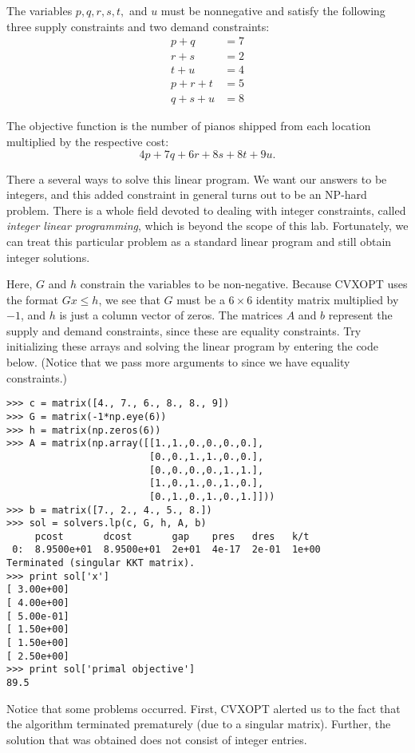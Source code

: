 The variables $p,q,r,s,t,$ and $u$ must be nonnegative and satisfy the following three supply constraints and two demand constraints:
\begin{align*}
p + q  &= 7\\
r + s  &= 2\\
t + u  &= 4\\
p + r + t &= 5\\
q + s + u &= 8
\end{align*}

The objective function is the number of pianos shipped from each location multiplied by the respective cost:
\[
4p + 7q + 6r + 8s + 8t + 9u.
\]

There a several ways to solve this linear program. We want our answers to be integers, and this added constraint in general turns out to be an NP-hard problem.
There is a whole field devoted to dealing with integer constraints, called \emph{integer linear programming}, which is beyond the scope of this lab.
Fortunately, we can treat this particular problem as a standard linear program and still obtain integer solutions.

Here, $G$ and $h$ constrain the variables to be non-negative.
Because CVXOPT uses the format $Gx \leq h$, we see that $G$ must be a $6 \times 6$ identity matrix multiplied by $-1$, and
$h$ is just a column vector of zeros.
The matrices $A$ and $b$ represent the supply and demand constraints, since these are equality constraints.
Try initializing these arrays and solving the linear program by entering the code below. (Notice that
we pass more arguments to  since we have equality constraints.)
\begin{lstlisting}
>>> c = matrix([4., 7., 6., 8., 8., 9])
>>> G = matrix(-1*np.eye(6))
>>> h = matrix(np.zeros(6))
>>> A = matrix(np.array([[1.,1.,0.,0.,0.,0.],
                         [0.,0.,1.,1.,0.,0.],
                         [0.,0.,0.,0.,1.,1.],
                         [1.,0.,1.,0.,1.,0.],
                         [0.,1.,0.,1.,0.,1.]]))
>>> b = matrix([7., 2., 4., 5., 8.])
>>> sol = solvers.lp(c, G, h, A, b)
     pcost       dcost       gap    pres   dres   k/t
 0:  8.9500e+01  8.9500e+01  2e+01  4e-17  2e-01  1e+00
Terminated (singular KKT matrix).
>>> print sol['x']
[ 3.00e+00]
[ 4.00e+00]
[ 5.00e-01]
[ 1.50e+00]
[ 1.50e+00]
[ 2.50e+00]
>>> print sol['primal objective']
89.5
\end{lstlisting}
Notice that some problems occurred. First, CVXOPT alerted us to the fact that the algorithm terminated prematurely (due to a singular matrix).
Further, the solution that was obtained does not consist of integer entries.

